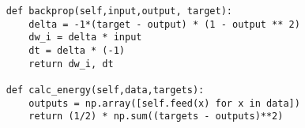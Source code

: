 \begin{verbatim}
    def backprop(self,input,output, target):
        delta = -1*(target - output) * (1 - output ** 2)
        dw_i = delta * input
        dt = delta * (-1)
        return dw_i, dt
    
    def calc_energy(self,data,targets):
        outputs = np.array([self.feed(x) for x in data])
        return (1/2) * np.sum((targets - outputs)**2)

\end{verbatim}